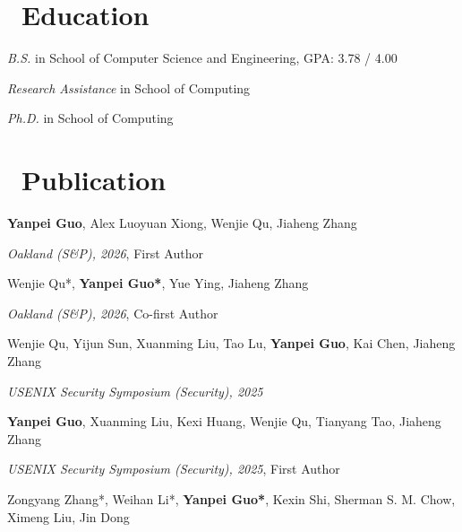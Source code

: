 \documentclass{resume}
\begin{document}



\section{\faGraduationCap\ Education}
\textit{B.S.} in School of Computer Science and Engineering, GPA: 3.78 / 4.00

\textit{Research Assistance} in School of Computing

\textit{Ph.D.} in School of Computing

\section{\faBook\ Publication}

\textbf{Yanpei Guo}, Alex Luoyuan Xiong, Wenjie Qu, Jiaheng Zhang

\textit{Oakland (S\&P), 2026}, First Author

Wenjie Qu*, \textbf{Yanpei Guo*}, Yue Ying, Jiaheng Zhang

\textit{Oakland (S\&P), 2026}, Co-first Author

Wenjie Qu, Yijun Sun, Xuanming Liu, Tao Lu, \textbf{Yanpei Guo}, Kai Chen, Jiaheng Zhang

\textit{USENIX Security Symposium (Security), 2025}

\textbf{Yanpei Guo}, Xuanming Liu, Kexi Huang, Wenjie Qu, Tianyang Tao, Jiaheng Zhang

\textit{USENIX Security Symposium (Security), 2025}, First Author

Zongyang Zhang*, Weihan Li*, \textbf{Yanpei Guo*}, Kexin Shi, Sherman S. M. Chow, Ximeng Liu, Jin Dong
\end{document}
